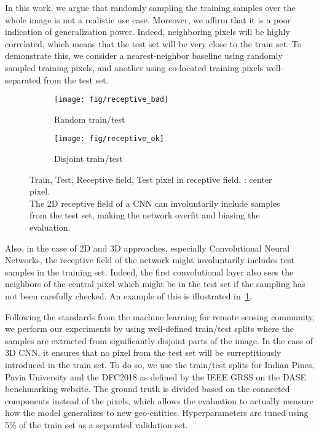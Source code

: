 \documentclass[journal]{IEEEtran}
\begin{document}
In this work, we argue that randomly sampling the training samples over the whole image is not a realistic use case. Moreover, we affirm that it is a poor indication of generalization power. Indeed, neighboring pixels will be highly correlated, which means that the test set will be very close to the train set. To demonstrate this, we consider a nearest-neighbor baseline using randomly sampled training pixels, and another using co-located training pixels well-separated from the test set.

\begin{figure}
\begin{subfigure}{0.25\textwidth}
	\texttt{[image: fig/receptive\_bad]}
	\caption*{Random train/test}
\end{subfigure}\begin{subfigure}{0.25\textwidth}
	\texttt{[image: fig/receptive\_ok]}
    \caption*{Disjoint train/test}
\end{subfigure}
\caption{\colorbox{color0}{Train}, \colorbox{color1}{Test}, \colorbox{color2}{Receptive field}, \colorbox{color3}{Test pixel in receptive field}, \textbullet: center pixel.\\The 2D receptive field of a CNN can involuntarily include samples from the test set, making the network overfit and biasing the evaluation.}
\label{fig:receptive_field}
\end{figure}

Also, in the case of 2D and 3D approaches, especially Convolutional Neural Networks, the receptive field of the network might involuntarily includes test samples in the training set. Indeed, the first convolutional layer also sees the neighbors of the central pixel which might be in the test set if the sampling has not been carefully checked. An example of this is illustrated in~\cref{fig:receptive_field}.

Following the standards from the machine learning for remote sensing community, we perform our experiments by using well-defined train/test splits where the samples are extracted from significantly disjoint parts of the image. In the case of 3D CNN, it ensures that no pixel from the test set will be surreptitiously introduced in the train set. To do so, we use the train/test splits for Indian Pines, Pavia University and the DFC2018 as defined by the IEEE GRSS on the DASE benchmarking website. The ground truth is divided based on the connected components instead of the pixels, which allows the evaluation to actually measure how the model generalizes to new geo-entities. Hyperparameters are tuned using 5\% of the train set as a separated validation set.
\end{document}
